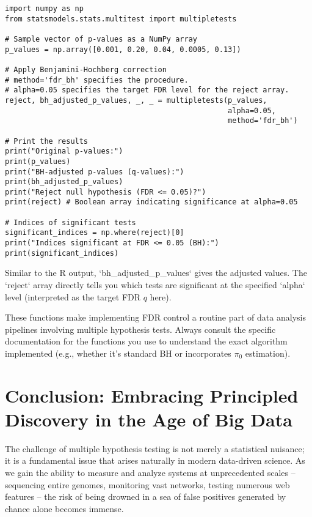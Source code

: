 \documentclass[12pt]{book}
\begin{document}
\begin{verbatim}
import numpy as np
from statsmodels.stats.multitest import multipletests

# Sample vector of p-values as a NumPy array
p_values = np.array([0.001, 0.20, 0.04, 0.0005, 0.13])

# Apply Benjamini-Hochberg correction
# method='fdr_bh' specifies the procedure.
# alpha=0.05 specifies the target FDR level for the reject array.
reject, bh_adjusted_p_values, _, _ = multipletests(p_values,
                                                   alpha=0.05,
                                                   method='fdr_bh')

# Print the results
print("Original p-values:")
print(p_values)
print("BH-adjusted p-values (q-values):")
print(bh_adjusted_p_values)
print("Reject null hypothesis (FDR <= 0.05)?")
print(reject) # Boolean array indicating significance at alpha=0.05

# Indices of significant tests
significant_indices = np.where(reject)[0]
print("Indices significant at FDR <= 0.05 (BH):")
print(significant_indices)
\end{verbatim}

Similar to the R output, `bh_adjusted_p_values` gives the adjusted values. The `reject` array directly tells you which tests are significant at the specified `alpha` level (interpreted as the target FDR $q$ here).

These functions make implementing FDR control a routine part of data analysis pipelines involving multiple hypothesis tests. Always consult the specific documentation for the functions you use to understand the exact algorithm implemented (e.g., whether it's standard BH or incorporates $\pi_0$ estimation).

\chapter{Conclusion: Embracing Principled Discovery in the Age of Big Data}
\label{chap:conclusion}

The challenge of multiple hypothesis testing is not merely a statistical nuisance; it is a fundamental issue that arises naturally in modern data-driven science. As we gain the ability to measure and analyze systems at unprecedented scales – sequencing entire genomes, monitoring vast networks, testing numerous web features – the risk of being drowned in a sea of false positives generated by chance alone becomes immense.
\end{document}
